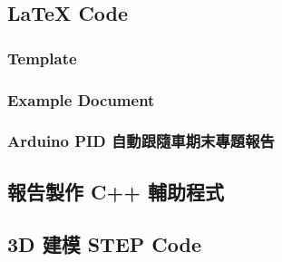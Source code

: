 \documentclass[a4paper,12pt]{./article}
\begin{document}
\subsection{\LaTeX{} Code}
\subsubsection{Template}

\subsubsection{Example Document}

\subsubsection{Arduino PID 自動跟隨車期末專題報告}

\subsection{報告製作 C++ 輔助程式}


\subsection{3D 建模 STEP Code}

\end{document}

